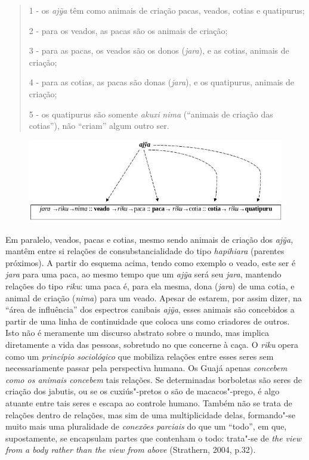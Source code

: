 \begin{quote}
1 - os \emph{ajỹa} têm como animais de criação pacas, veados, cotias e
quatipurus;

2 - para os veados, as pacas são os animais de criação;

3 - para as pacas, os veados são os donos (\emph{jara}), e as cotias,
animais de criação;

4 - para as cotias, as pacas são donas (\emph{jara}), e os quatipurus,
animais de criação;

5 - os quatipurus são somente \emph{akuxi} \emph{nima} (``animais de
criação das cotias''), não ``criam'' algum outro ser.
\end{quote}

\begin{figure}[H]
\centering
  \includegraphics[width=\textwidth]{./imgs/Figura_13}
\end{figure}


Em paralelo, veados, pacas e cotias, mesmo sendo animais de criação dos
\emph{ajỹa,} mantêm entre si relações de consubstancialidade do tipo
\emph{hapihiara} (parentes próximos). A partir do esquema acima, tendo
como exemplo o veado, este ser é \emph{jara} para uma paca, ao mesmo
tempo que um \emph{ajỹa} será seu \emph{jara}, mantendo relações do tipo
\emph{riku}: uma paca é, para ela mesma, dona (\emph{jara}) de uma
cotia, e animal de criação (\emph{nima}) para um veado. Apesar de
estarem, por assim dizer, na ``área de influência'' dos espectros canibais
\emph{ajỹa}, esses animais são concebidos a partir de uma linha de
continuidade que coloca uns como criadores de outros. Isto não é
meramente um discurso abstrato sobre o mundo, mas implica diretamente a
vida das pessoas, sobretudo no que concerne à caça. O \emph{riku} opera
como um \emph{princípio sociológico} que mobiliza relações entre esses
seres sem necessariamente passar pela perspectiva humana. Os Guajá
apenas \emph{concebem} \emph{como os animais concebem} tais relações. Se
determinadas borboletas são seres de criação dos jabutis, ou se os
cuxiús"-pretos o são de macacos"-prego, é algo atuante entre tais seres e
escapa ao controle humano. Também não se trata de relações dentro de
relações, mas sim de uma multiplicidade delas, formando"-se muito mais
uma pluralidade de \emph{conexões parciais} do que um ``todo'', em que,
supostamente, se encapsulam partes que contenham o todo: trata"-se de
\emph{the view from a body rather than the view from above} (Strathern,
2004, p.32)\emph{.}


